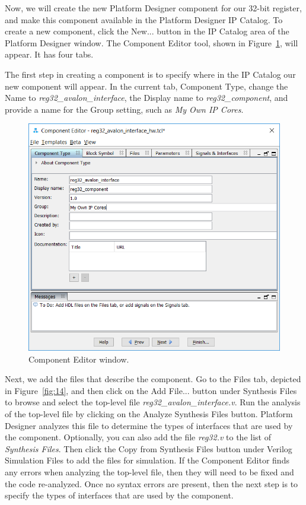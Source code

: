 \documentclass[11pt, twoside, pdftex]{article}
\begin{document}
\clearpage
\newpage
Now, we will create the new Platform Designer component for our 32-bit register, and make this
component available in the Platform Designer IP Catalog.
To create a new component, click the {\sf New...} button in the {\sf IP Catalog} area of
the Platform Designer window. The Component Editor tool, shown in Figure~\ref{fig:13}, 
will appear. It has four tabs. 

The first step in creating a component is to specify where in the 
IP Catalog our new component will appear. In the current tab, {\sf Component Type}, change the {\sf Name} to {\it reg32\_avalon\_interface}, the {\sf Display name} to {\it reg32\_component}, and
provide a name for the {\sf Group} setting, such as {\it My Own IP Cores}.

\begin{figure}[H]
   \begin{center}
        \includegraphics[scale=0.75]{figures/figure13.png}
   \end{center}
   \caption{Component Editor window.}
	\label{fig:13}
\end{figure}
\clearpage
\newpage
Next, we add the files that describe the component. Go to the {\sf Files} tab, depicted in
Figure~\ref{fig:14}, and then click on the {\sf Add File...} button under {\sf Synthesis Files} to browse and select the top-level 
file {\it reg32\_avalon\_interface.v}. Run the analysis of the top-level file by clicking on the {\sf Analyze Synthesis Files} button. Platform Designer analyzes this file to
determine the types of interfaces that are used by the component. Optionally, you can also
add the file {\it reg32.v} to the list of {\it Synthesis Files}. Then click the {\sf Copy from Synthesis Files} button under {\sf Verilog Simulation Files} to add the files for simulation. If the Component Editor finds any errors when analyzing the top-level file,
then they will need to be fixed and the code re-analyzed. Once no syntax errors are present, 
then the next step is to specify the types of interfaces that are used by the component.
\end{document}
